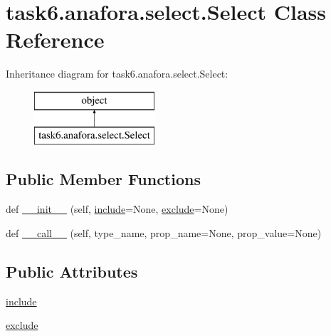 \hypertarget{classtask6_1_1anafora_1_1select_1_1Select}{}\section{task6.\+anafora.\+select.\+Select Class Reference}
\label{classtask6_1_1anafora_1_1select_1_1Select}
Inheritance diagram for task6.\+anafora.\+select.\+Select\+:\begin{figure}[H]
\begin{center}
\leavevmode
\includegraphics[height=2.000000cm]{classtask6_1_1anafora_1_1select_1_1Select}
\end{center}
\end{figure}
\subsection*{Public Member Functions}
\begin{DoxyCompactItemize}
\item 
def \hyperlink{classtask6_1_1anafora_1_1select_1_1Select_ad46c41160744686802479205cf759777}{\+\_\+\+\_\+init\+\_\+\+\_\+} (self, \hyperlink{classtask6_1_1anafora_1_1select_1_1Select_a7e6ff1b21d990640f459026a1c32e84a}{include}=None, \hyperlink{classtask6_1_1anafora_1_1select_1_1Select_a9209a1f73cc9fad75bf19beced4b19a1}{exclude}=None)
\item 
def \hyperlink{classtask6_1_1anafora_1_1select_1_1Select_aaea6b76ade44eb3b8203d67a7721f88e}{\+\_\+\+\_\+call\+\_\+\+\_\+} (self, type\+\_\+name, prop\+\_\+name=None, prop\+\_\+value=None)
\end{DoxyCompactItemize}
\subsection*{Public Attributes}
\begin{DoxyCompactItemize}
\item 
\hyperlink{classtask6_1_1anafora_1_1select_1_1Select_a7e6ff1b21d990640f459026a1c32e84a}{include}
\item 
\hyperlink{classtask6_1_1anafora_1_1select_1_1Select_a9209a1f73cc9fad75bf19beced4b19a1}{exclude}
\end{DoxyCompactItemize}


